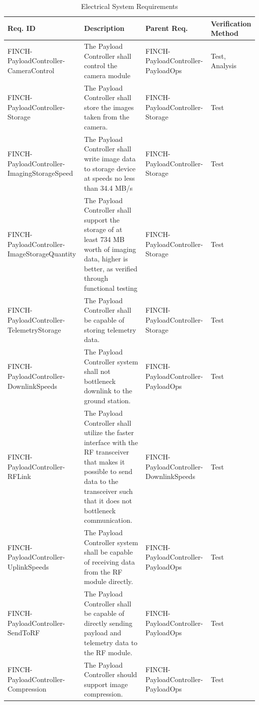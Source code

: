 \documentclass[12pt,a4paper]{article}
\begin{document}
    \begin{table}[H]
        \centering
        \begin{tabular}{|>{\centering\arraybackslash}m{3cm} 
                    |>{\raggedright\arraybackslash}m{7cm} 
                    |>{\centering\arraybackslash}m{3cm} 
                    |>{\centering\arraybackslash}m{2.5cm}|}\hline
            \textbf{Req. ID} & \centering \textbf{Description} & \textbf{Parent Req.} & \textbf{Verification Method}\\\hline
 FINCH-PayloadController-CameraControl& The Payload Controller shall control the camera module& FINCH-PayloadController-PayloadOps&Test, Analysis\\\hline
 FINCH-PayloadController-Storage& The Payload Controller shall store the images taken from the camera.& FINCH-PayloadController-Storage&Test\\\hline
 FINCH-PayloadController-ImagingStorageSpeed& The Payload Controller shall write image data to storage device at speeds no less than 34.4 MB/s& FINCH-PayloadController-Storage&Test\\\hline
 FINCH-PayloadController-ImageStorageQuantity& The Payload Controller shall support the storage of at least 734 MB worth of imaging data, higher is better, as verified through functional testing& FINCH-PayloadController-Storage&Test\\\hline
 FINCH-PayloadController-TelemetryStorage& The Payload Controller shall be capable of storing telemetry data.& FINCH-PayloadController-Storage&Test\\\hline
 FINCH-PayloadController-DownlinkSpeeds& The Payload Controller system shall not bottleneck downlink to the ground station. & FINCH-PayloadController-PayloadOps&Test\\\hline
 FINCH-PayloadController-RFLink& The Payload Controller shall utilize the faster interface with the RF transceiver that makes it possible to send data to the transceiver such that it does not bottleneck communication.& FINCH-PayloadController-DownlinkSpeeds&Test\\\hline
 FINCH-PayloadController-UplinkSpeeds& The Payload Controller system shall be capable of receiving data from the RF module directly. & FINCH-PayloadController-PayloadOps&Test\\\hline
 FINCH-PayloadController-SendToRF& The Payload Controller shall be capable of directly sending payload and telemetry data to the RF module.& FINCH-PayloadController-PayloadOps&Test\\\hline
 FINCH-PayloadController-Compression& The Payload Controller should support image compression.& FINCH-PayloadController-PayloadOps&Test\\\hline
        \end{tabular}
        \caption{Electrical System Requirements}\label{tab:pay_reqs}
    \end{table}
\end{document}
